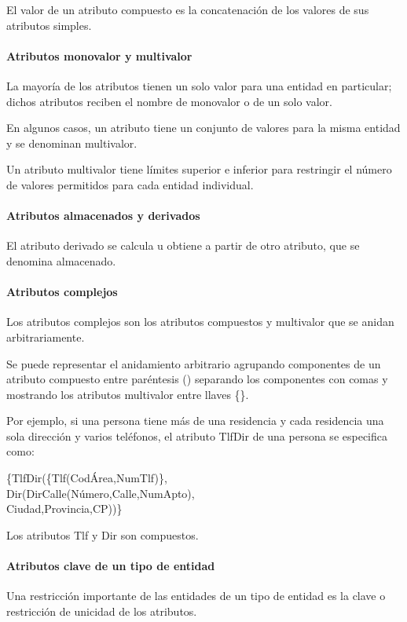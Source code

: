 El valor de un atributo compuesto es la concatenación de los valores de sus atributos simples.

\paragraph*{Atributos monovalor y multivalor}  La mayoría de los atributos tienen un solo valor para una entidad en particular; dichos atributos reciben el nombre de monovalor o de un solo valor. 


En algunos casos, un atributo tiene un conjunto de valores para la misma entidad y se denominan multivalor.


Un atributo multivalor tiene límites superior e inferior para restringir el número de valores permitidos para cada entidad individual.


\paragraph*{Atributos almacenados y derivados}
El atributo derivado se calcula u obtiene a partir de otro atributo, que se denomina almacenado.


\paragraph*{Atributos complejos}

Los atributos complejos son los atributos compuestos y multivalor que se anidan arbitrariamente.

Se puede representar el anidamiento arbitrario agrupando componentes de un atributo compuesto entre paréntesis () separando los componentes con comas y mostrando los atributos multivalor entre llaves \{\}. 

Por ejemplo, si una persona tiene más de una residencia y cada
residencia una sola dirección y varios teléfonos, el atributo TlfDir de una persona se especifica como:


\{TlfDir(\{Tlf(CodÁrea,NumTlf)\},\\
Dir(DirCalle(Número,Calle,NumApto),\\
Ciudad,Provincia,CP))\}


Los atributos Tlf y Dir son compuestos.
\paragraph*{Atributos clave de un tipo de entidad}
Una restricción importante de las entidades de un tipo de entidad es la clave o restricción de unicidad de los atributos.


